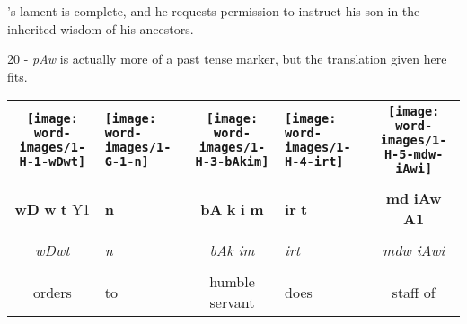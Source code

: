 's lament is complete, and he requests permission to instruct his son in the inherited wisdom of his ancestors.

\vspace*{\fill}

20 - \textit{pAw} is actually more of a past tense marker, but the translation given here fits.

\vspace*{\fill}

\pagebreak


\vspace*{\fill}

\begin{tabularx}{\linewidth}{cYcYc}
	\texttt{[image: word-images/1-H-1-wDwt]} &
	\hspace*{-3mm}\texttt{[image: word-images/1-G-1-n]} &
	\texttt{[image: word-images/1-H-3-bAkim]} &
	\hspace*{-4mm} \texttt{[image: word-images/1-H-4-irt]} &
	\texttt{[image: word-images/1-H-5-mdw-iAwi]} \\
	\hline \\ 
	\textbf{wD} \textbf{w} \textbf{t} Y1 &
	\textbf{n} &
	\textbf{bA} \textbf{k} \textbf{i} \textbf{m} &
	\textbf{ir} \textbf{t} &
	\textbf{md} \textbf{iAw} \textbf{A1} \\
	\hline \\ 
	\textit{wDwt} & \textit{n} & \textit{bAk im} & \textit{irt} & \textit{mdw iAwi} \\
	\hline \\ 
	orders & to & humble servant & \hspace*{-4mm}does & staff of 
\end{tabularx}

\vspace{7.5mm}

